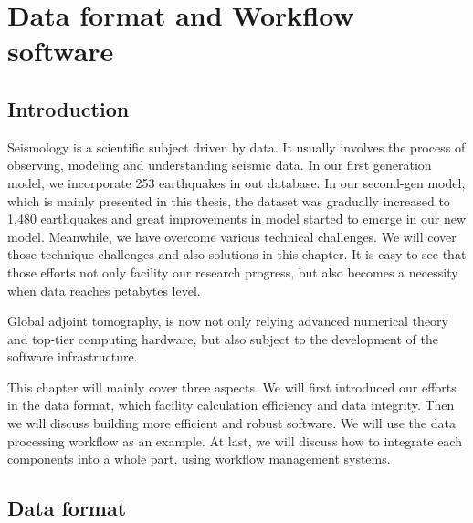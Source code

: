\chapter{Data format and Workflow software}
\label{ch:tools}

\section{Introduction}

Seismology is a scientific subject driven by data. It usually involves the process
of observing, modeling and understanding seismic data. In our first generation
model, we incorporate 253 earthquakes in out database. In our second-gen
model, which is mainly presented in this thesis, the dataset was gradually
increased to 1,480 earthquakes and great improvements in model started to
emerge in our new model. Meanwhile, we have overcome various technical
challenges. We will cover those technique challenges and also solutions
in this chapter. It is easy to see that those efforts not only facility
our research progress, but also becomes a necessity when data reaches
petabytes level.

Global adjoint tomography, is now not only relying advanced
numerical theory and top-tier computing hardware, but also subject to 
the development of the software infrastructure.

This chapter will mainly cover three aspects. We will first introduced
our efforts in the data format, which facility calculation efficiency
and data integrity. Then we will discuss building more efficient
and robust software. We will use the data processing workflow as an
example. At last, we will discuss how to integrate each components
into a whole part, using workflow management systems.


\section{Data format}

